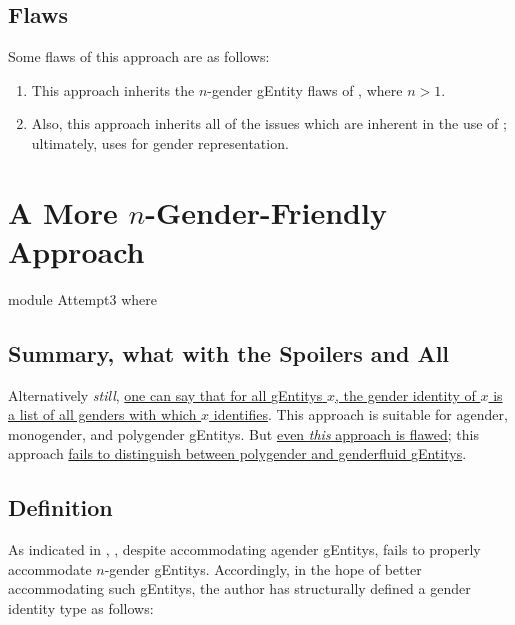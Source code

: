 \documentclass{article}
\theoremstyle{remark}
\newcommand{\summaryLink}[2]{\hyperref[#1]{#2}}
\begin{document}
\subsection{Flaws}\label{sec:gender2flaws}
Some flaws of this approach are as follows:

\begin{enumerate}
  \item This approach inherits the \(n\)-gender \gls{gEntity} flaws of , where \(n > 1\).\label{enum:gender2nGender}
  \item Also, this approach inherits all of the issues which are inherent in the use of ; ultimately,  uses  for gender representation.\label{enum:gender2problemInheritance}
\end{enumerate}

\section{A More \(n\)-Gender-Friendly Approach}

\begin{code}
module Attempt3 where
\end{code}

\subsection{Summary, what with the Spoilers and All}
Alternatively \emph{still}, \summaryLink{sec:gender3definition}{one can say that for all \glspl{gEntity} \(x\), the gender identity of \(x\) is a list of all genders with which \(x\) identifies}.  This approach is suitable for agender, monogender, and polygender \glspl{gEntity}.  But \summaryLink{sec:gender2flaws}{even \emph{this} approach is flawed}; this approach \summaryLink{enum:gender2genderfluidOrPolygender}{fails to distinguish between polygender and genderfluid \glspl{gEntity}}.

\subsection{Definition}\label{sec:gender3definition}
As indicated in , , despite accommodating agender \glspl{gEntity}, fails to properly accommodate \(n\)-gender \glspl{gEntity}.  Accordingly, in the hope of better accommodating such \glspl{gEntity}, the author has structurally defined a gender identity type  as follows:
\end{document}
